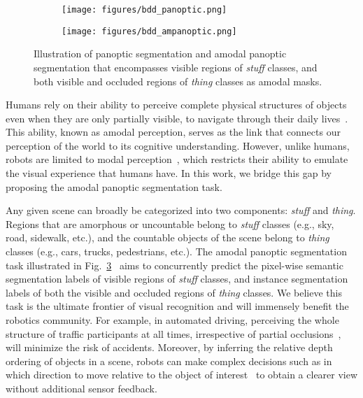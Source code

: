 \documentclass[10pt,twocolumn,letterpaper]{article}
\newcommand{\figref}[1]{Fig.~\ref{#1}}
\begin{document}
\begin{figure}
    \centering
    \begin{subfigure}[b]{\linewidth}
        \centering
        \texttt{[image: figures/bdd\_panoptic.png]}
        \label{panoptic_segmentation_eg}
    \end{subfigure}
    \begin{subfigure}[b]{\linewidth}
        \centering 
        \texttt{[image: figures/bdd\_ampanoptic.png]}
        \label{amodal_panoptic_segmentation_eg}
    \end{subfigure}
    \vspace{-0.5cm}
    \caption{Illustration of  panoptic segmentation and  amodal panoptic segmentation that encompasses visible regions of \textit{stuff} classes, and both visible and occluded regions of \textit{thing} classes as amodal masks.}
    \label{fig:paper-teaser}
    \vspace{-0.5cm}
\end{figure}

Humans rely on their ability to perceive complete physical structures of objects even when they are only partially visible, to navigate through their daily lives~\cite{nanay2018importance}. This ability, known as amodal perception, serves as the link that connects our perception of the world to its cognitive understanding. However, unlike humans, robots are limited to modal perception~\cite{valada2016convoluted, zurn2020self, mittal2018vision}, which restricts their ability to emulate the visual experience that humans have. In this work, we bridge this gap by proposing the amodal panoptic segmentation task.

Any given scene can broadly be categorized into two components: \textit{stuff} and \textit{thing}. Regions that are amorphous or uncountable belong to \textit{stuff} classes (e.g., sky, road, sidewalk, etc.), and the countable objects of the scene belong to \textit{thing} classes (e.g., cars, trucks, pedestrians, etc.). The amodal panoptic segmentation task illustrated in \figref{fig:paper-teaser}~ aims to concurrently predict the pixel-wise semantic segmentation labels of visible regions of \textit{stuff} classes, and instance segmentation labels of both the visible and occluded regions of \textit{thing} classes. We believe this task is the ultimate frontier of visual recognition and will immensely benefit the robotics community. For example, in automated driving, perceiving the whole structure of traffic participants at all times, irrespective of partial occlusions~\cite{valverde2021there}, will minimize the risk of accidents. Moreover, by inferring the relative depth ordering of objects in a scene, robots can make complex decisions such as in which direction to move relative to the object of interest~\cite{hurtado2021learning} to obtain a clearer view without additional sensor feedback.
\end{document}
